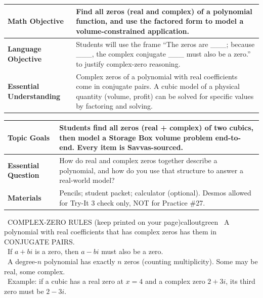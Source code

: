 \documentclass[11pt]{article}
\begin{document}

{\small
\renewcommand{\arraystretch}{1.25}
\noindent\begin{tabular}{|p{1.8in}|p{4.8in}|}
\hline
\textbf{Math Objective} & Find all zeros (real and complex) of a polynomial function, and use the factored form to model a volume-constrained application. \\ \hline
\textbf{Language Objective} & Students will use the frame ``The zeros are \_\_\_; because \_\_\_, the complex conjugate \_\_\_ must also be a zero.'' to justify complex-zero reasoning. \\ \hline
\textbf{Essential Understanding} & Complex zeros of a polynomial with real coefficients come in conjugate pairs. A cubic model of a physical quantity (volume, profit) can be solved for specific values by factoring and solving. \\ \hline
\end{tabular}
}

{\small
\renewcommand{\arraystretch}{1.25}
\noindent\begin{tabular}{|p{1.8in}|p{4.8in}|}
\hline
\textbf{Topic Goals} & Students find all zeros (real + complex) of two cubics, then model a Storage Box volume problem end-to-end. Every item is Savvas-sourced. \\ \hline
\textbf{Essential Question} & How do real and complex zeros together describe a polynomial, and how do you use that structure to answer a real-world model? \\ \hline
\textbf{Materials} & Pencils; student packet; calculator (optional). Desmos allowed for Try-It 3 check only, NOT for Practice \#27. \\ \hline
\end{tabular}
}


\begin{callout}{\IconBook\ COMPLEX-ZERO RULES (keep printed on your page)}{calloutgreen}
\textbullet\ A polynomial with real coefficients that has complex zeros has them in CONJUGATE PAIRS.\\
\textbullet\ If \(a + bi\) is a zero, then \(a - bi\) must also be a zero.\\
\textbullet\ A degree-\(n\) polynomial has exactly \(n\) zeros (counting multiplicity). Some may be real, some complex.\\
\textbullet\ Example: if a cubic has a real zero at \(x = 4\) and a complex zero \(2 + 3i\), its third zero must be \(2 - 3i\).
\end{callout}
\end{document}
